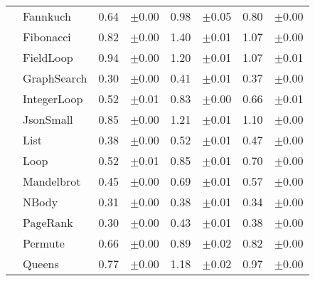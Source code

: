 \begin{tabular}{ll@{\hspace{6pt}}r@{\hspace{3pt}}l@{\hspace{6pt}}r@{\hspace{3pt}}l@{\hspace{6pt}}r@{\hspace{3pt}}l}
 & Fannkuch & 0.64 & \scriptsize\textcolor{gray!60}{$\pm$0.00} & 0.98 & \scriptsize\textcolor{gray!60}{$\pm$0.05} & 0.80 & \scriptsize\textcolor{gray!60}{$\pm$0.00} \\
 & Fibonacci & 0.82 & \scriptsize\textcolor{gray!60}{$\pm$0.00} & 1.40 & \scriptsize\textcolor{gray!60}{$\pm$0.01} & 1.07 & \scriptsize\textcolor{gray!60}{$\pm$0.00} \\
 & FieldLoop & 0.94 & \scriptsize\textcolor{gray!60}{$\pm$0.00} & 1.20 & \scriptsize\textcolor{gray!60}{$\pm$0.01} & 1.07 & \scriptsize\textcolor{gray!60}{$\pm$0.01} \\
 & GraphSearch & 0.30 & \scriptsize\textcolor{gray!60}{$\pm$0.00} & 0.41 & \scriptsize\textcolor{gray!60}{$\pm$0.01} & 0.37 & \scriptsize\textcolor{gray!60}{$\pm$0.00} \\
 & IntegerLoop & 0.52 & \scriptsize\textcolor{gray!60}{$\pm$0.01} & 0.83 & \scriptsize\textcolor{gray!60}{$\pm$0.00} & 0.66 & \scriptsize\textcolor{gray!60}{$\pm$0.01} \\
 & JsonSmall & 0.85 & \scriptsize\textcolor{gray!60}{$\pm$0.00} & 1.21 & \scriptsize\textcolor{gray!60}{$\pm$0.01} & 1.10 & \scriptsize\textcolor{gray!60}{$\pm$0.00} \\
 & List & 0.38 & \scriptsize\textcolor{gray!60}{$\pm$0.00} & 0.52 & \scriptsize\textcolor{gray!60}{$\pm$0.01} & 0.47 & \scriptsize\textcolor{gray!60}{$\pm$0.00} \\
 & Loop & 0.52 & \scriptsize\textcolor{gray!60}{$\pm$0.01} & 0.85 & \scriptsize\textcolor{gray!60}{$\pm$0.01} & 0.70 & \scriptsize\textcolor{gray!60}{$\pm$0.00} \\
 & Mandelbrot & 0.45 & \scriptsize\textcolor{gray!60}{$\pm$0.00} & 0.69 & \scriptsize\textcolor{gray!60}{$\pm$0.01} & 0.57 & \scriptsize\textcolor{gray!60}{$\pm$0.00} \\
 & NBody & 0.31 & \scriptsize\textcolor{gray!60}{$\pm$0.00} & 0.38 & \scriptsize\textcolor{gray!60}{$\pm$0.01} & 0.34 & \scriptsize\textcolor{gray!60}{$\pm$0.00} \\
 & PageRank & 0.30 & \scriptsize\textcolor{gray!60}{$\pm$0.00} & 0.43 & \scriptsize\textcolor{gray!60}{$\pm$0.01} & 0.38 & \scriptsize\textcolor{gray!60}{$\pm$0.00} \\
 & Permute & 0.66 & \scriptsize\textcolor{gray!60}{$\pm$0.00} & 0.89 & \scriptsize\textcolor{gray!60}{$\pm$0.02} & 0.82 & \scriptsize\textcolor{gray!60}{$\pm$0.00} \\
 & Queens & 0.77 & \scriptsize\textcolor{gray!60}{$\pm$0.00} & 1.18 & \scriptsize\textcolor{gray!60}{$\pm$0.02} & 0.97 & \scriptsize\textcolor{gray!60}{$\pm$0.00} \\

\end{tabular}
